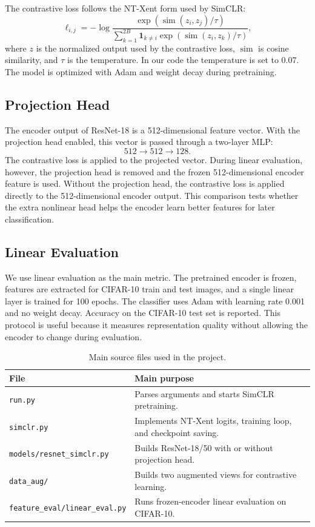 \documentclass[10pt]{article}
\begin{document}
The contrastive loss follows the NT-Xent form used by SimCLR:
\[
\ell_{i,j} =
-\log
\frac{\exp(\operatorname{sim}(z_i,z_j)/\tau)}
{\sum_{k=1}^{2B} \mathbf{1}_{k \ne i}
\exp(\operatorname{sim}(z_i,z_k)/\tau)} ,
\]
where $z$ is the normalized output used by the contrastive loss, $\operatorname{sim}$ is cosine similarity, and $\tau$ is the temperature. In our code the temperature is set to 0.07. The model is optimized with Adam and weight decay during pretraining.

\subsection{Projection Head}

The encoder output of ResNet-18 is a 512-dimensional feature vector. With the projection head enabled, this vector is passed through a two-layer MLP:
\[
512 \rightarrow 512 \rightarrow 128.
\]
The contrastive loss is applied to the projected vector. During linear
evaluation, however, the projection head is removed and the frozen
512-dimensional encoder feature is used. Without the projection head, the
contrastive loss is applied directly to the 512-dimensional encoder output. This comparison tests whether the extra nonlinear head helps the encoder learn better features for later classification.

\subsection{Linear Evaluation}

We use linear evaluation as the main metric. The pretrained encoder is frozen, features are extracted for CIFAR-10 train and test images, and a single linear layer is trained for 100 epochs. The classifier uses Adam with learning rate 0.001 and no weight decay. Accuracy on the CIFAR-10 test set is reported. This protocol is useful because it measures representation quality without allowing the encoder to change during evaluation.

\begin{table}[H]
\centering
\small
\begin{tabular}{ll}
\toprule
\textbf{File} & \textbf{Main purpose} \\
\midrule
\texttt{run.py} & Parses arguments and starts SimCLR pretraining. \\
\texttt{simclr.py} & Implements NT-Xent logits, training loop, and checkpoint saving. \\
\texttt{models/resnet\_simclr.py} & Builds ResNet-18/50 with or without projection head. \\
\texttt{data\_aug/} & Builds two augmented views for contrastive learning. \\
\texttt{feature\_eval/linear\_eval.py} & Runs frozen-encoder linear evaluation on CIFAR-10. \\
\bottomrule
\end{tabular}
\caption{Main source files used in the project.}
\label{tab:modules}
\end{table}
\end{document}
